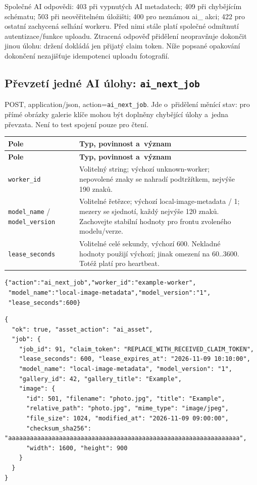 \documentclass[11pt,a4paper]{article}
\newcommand{\codeword}[1]{\nolinkurl{#1}}
\begin{document}
Společné AI odpovědi: 403 při vypnutých AI metadatech; 409 při chybějícím schématu; 503 při
neověřitelném úložišti; 400 pro neznámou ai\_ akci; 422 pro ostatní zachycená selhání
workeru. Před nimi stále platí společné odmítnutí autentizace/funkce uploadu. Ztracená
odpověď přidělení neopravňuje dokončit jinou úlohu: držení dokládá jen přijatý claim token.
Níže popsané opakování dokončení nezajišťuje idempotenci uploadu fotografií.

\subsection{\texorpdfstring{Převzetí jedné AI úlohy: \codeword{ai_next_job}}{Převzetí jedné AI úlohy: ai\_next\_job}}

\label{api352:ai-next-job}

POST, application/json, action=\codeword{ai_next_job}. Jde o~přidělení měnící stav: pro
přímé obrázky galerie klíče mohou být doplněny chybějící úlohy a~jedna převzata. Není to
test spojení pouze pro čtení.

\begin{longtable}{@{}>{\RaggedRight\arraybackslash}p{0.28\linewidth}>{\RaggedRight\arraybackslash}p{0.67\linewidth}@{}}
\toprule
\textbf{Pole} & \textbf{Typ, povinnost a~význam} \\
\midrule
\endfirsthead
\toprule
\textbf{Pole} & \textbf{Typ, povinnost a~význam} \\
\midrule
\endhead
\bottomrule
\endfoot
\codeword{worker_id} & Volitelný string; výchozí unknown-worker; nepovolené znaky se nahradí
podtržítkem, nejvýše 190 znaků. \\
\codeword{model_name} / \codeword{model_version} & Volitelné řetězce; výchozí
local-image-metadata / 1; mezery se sjednotí, každý nejvýše 120 znaků. Zachovejte stabilní
hodnoty pro frontu zvoleného modelu/verze. \\
\codeword{lease_seconds} & Volitelné celé sekundy, výchozí 600. Nekladné hodnoty použijí
výchozí; jinak omezení na 60..3600. Totéž platí pro heartbeat. \\
\end{longtable}

\begin{lstlisting}[language={}]
{"action":"ai_next_job","worker_id":"example-worker",
 "model_name":"local-image-metadata","model_version":"1",
 "lease_seconds":600}
\end{lstlisting}

\begin{lstlisting}[language={}]
{
  "ok": true, "asset_action": "ai_asset",
  "job": {
    "job_id": 91, "claim_token": "REPLACE_WITH_RECEIVED_CLAIM_TOKEN",
    "lease_seconds": 600, "lease_expires_at": "2026-11-09 10:10:00",
    "model_name": "local-image-metadata", "model_version": "1",
    "gallery_id": 42, "gallery_title": "Example",
    "image": {
      "id": 501, "filename": "photo.jpg", "title": "Example",
      "relative_path": "photo.jpg", "mime_type": "image/jpeg",
      "file_size": 1024, "modified_at": "2026-11-09 09:00:00",
      "checksum_sha256": "aaaaaaaaaaaaaaaaaaaaaaaaaaaaaaaaaaaaaaaaaaaaaaaaaaaaaaaaaaaaaaaa",
      "width": 1600, "height": 900
    }
  }
}
\end{lstlisting}
\end{document}

